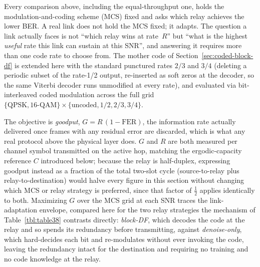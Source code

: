 Every comparison above, including the equal-throughput one, holds the modulation-and-coding scheme (MCS) fixed and asks which relay achieves the lower BER. A real link does not hold the MCS fixed; it adapts. The question a link actually faces is not ``which relay wins at rate~$R$'' but ``what is the highest \emph{useful} rate this link can sustain at this SNR'', and answering it requires more than one code rate to choose from. The mother code of Section~\ref{sec:coded-block-df} is extended here with the standard punctured rates $2/3$ and $3/4$ (deleting a periodic subset of the rate-1/2 output, re-inserted as soft zeros at the decoder, so the same Viterbi decoder runs unmodified at every rate), and evaluated via bit-interleaved coded modulation across the full grid $\{\text{QPSK}, \text{16-QAM}\} \times \{\text{uncoded}, 1/2, 2/3, 3/4\}$.

The objective is \emph{goodput}, $G = R\,(1-\mathrm{FER})$, the information rate actually delivered once frames with any residual error are discarded, which is what any real protocol above the physical layer does. $G$ and $R$ are both measured per channel symbol transmitted on the active hop, matching the ergodic-capacity reference $C$ introduced below; because the relay is half-duplex, expressing goodput instead as a fraction of the total two-slot cycle (source-to-relay plus relay-to-destination) would halve every figure in this section without changing which MCS or relay strategy is preferred, since that factor of $\tfrac12$ applies identically to both. Maximizing $G$ over the MCS grid at each SNR traces the link-adaptation envelope, compared here for the two relay strategies the mechanism of Table~\ref{tbl:table38} contrasts directly: \emph{block-DF}, which decodes the code at the relay and so spends its redundancy before transmitting, against \emph{denoise-only}, which hard-decides each bit and re-modulates without ever invoking the code, leaving the redundancy intact for the destination and requiring no training and no code knowledge at the relay.

